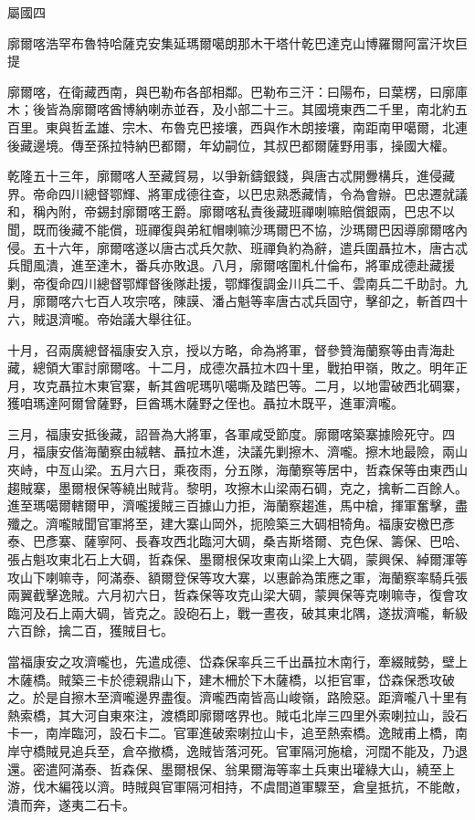 
\begin{pinyinscope}
屬國四

廓爾喀浩罕布魯特哈薩克安集延瑪爾噶朗那木干塔什乾巴達克山博羅爾阿富汗坎巨提

廓爾喀，在衛藏西南，與巴勒布各部相鄰。巴勒布三汗：曰陽布，曰葉楞，曰廓庫木；後皆為廓爾喀酋博納喇赤並吞，及小部二十三。其國境東西二千里，南北約五百里。東與哲孟雄、宗木、布魯克巴接壤，西與作木朗接壤，南距南甲噶爾，北連後藏邊境。傳至孫拉特納巴都爾，年幼嗣位，其叔巴都爾薩野用事，操國大權。

乾隆五十三年，廓爾喀人至藏貿易，以爭新鑄銀錢，與唐古忒開釁構兵，進侵藏界。帝命四川總督鄂輝、將軍成德往查，以巴忠熟悉藏情，令為會辦。巴忠遷就議和，稱內附，帝錫封廓爾喀王爵。廓爾喀私責後藏班禪喇嘛賠償銀兩，巴忠不以聞，既而後藏不能償，班禪復與弟紅帽喇嘛沙瑪爾巴不協，沙瑪爾巴因導廓爾喀內侵。五十六年，廓爾喀遂以唐古忒兵欠款、班禪負約為辭，遣兵圍聶拉木，唐古忒兵聞風潰，進至達木，番兵亦敗退。八月，廓爾喀圍札什倫布，將軍成德赴藏援剿，帝復命四川總督鄂輝督後隊赴援，鄂輝復調金川兵二千、雲南兵二千助討。九月，廓爾喀六七百人攻宗喀，陳謨、潘占魁等率唐古忒兵固守，擊卻之，斬首四十六，賊退濟嚨。帝始議大舉往征。

十月，召兩廣總督福康安入京，授以方略，命為將軍，督參贊海蘭察等由青海赴藏，總領大軍討廓爾喀。十二月，成德次聶拉木四十里，戰拍甲嶺，敗之。明年正月，攻克聶拉木東官寨，斬其酋呢瑪叭噶嘶及踏巴等。二月，以地雷破西北碉寨，獲咱瑪達阿爾曾薩野，巨酋瑪木薩野之侄也。聶拉木既平，進軍濟嚨。

三月，福康安抵後藏，詔晉為大將軍，各軍咸受節度。廓爾喀築寨據險死守。四月，福康安偕海蘭察由絨轄、聶拉木進，決議先剿擦木、濟嚨。擦木地最險，兩山夾峙，中亙山梁。五月六日，乘夜雨，分五隊，海蘭察等居中，哲森保等由東西山趨賊寨，墨爾根保等繞出賊背。黎明，攻擦木山梁兩石碉，克之，擒斬二百餘人。進至瑪噶爾轄爾甲，濟嚨援賊三百據山力拒，海蘭察趨進，馬中槍，揮軍奮擊，盡殲之。濟嚨賊聞官軍將至，建大寨山岡外，扼險築三大碉相犄角。福康安檄巴彥泰、巴彥寨、薩寧阿、長春攻西北臨河大碉，桑吉斯塔爾、克色保、籌保、巴哈、張占魁攻東北石上大碉，哲森保、墨爾根保攻東南山梁上大碉，蒙興保、綽爾渾等攻山下喇嘛寺，阿滿泰、額爾登保等攻大寨，以惠齡為策應之軍，海蘭察率騎兵張兩翼截擊逸賊。六月初六日，哲森保等攻克山梁大碉，蒙興保等克喇嘛寺，復會攻臨河及石上兩大碉，皆克之。設砲石上，戰一晝夜，破其東北隅，遂拔濟嚨，斬級六百餘，擒二百，獲賊目七。

當福康安之攻濟嚨也，先遣成德、岱森保率兵三千出聶拉木南行，牽綴賊勢，壁上木薩橋。賊築三卡於德親鼎山下，建木柵於下木薩橋，以拒官軍，岱森保悉攻破之。於是自擦木至濟嚨邊界盡復。濟嚨西南皆高山峻嶺，路險惡。距濟嚨八十里有熱索橋，其大河自東來注，渡橋即廓爾喀界也。賊屯北岸三四里外索喇拉山，設石卡一，南岸臨河，設石卡二。官軍進破索喇拉山卡，追至熱索橋。逸賊甫上橋，南岸守橋賊見追兵至，倉卒撤橋，逸賊皆落河死。官軍隔河施槍，河闊不能及，乃退還。密遣阿滿泰、哲森保、墨爾根保、翁果爾海等率土兵東出瓘綠大山，繞至上游，伐木編筏以濟。時賊與官軍隔河相持，不虞間道軍驟至，倉皇抵抗，不能敵，潰而奔，遂夷二石卡。


\end{pinyinscope}
